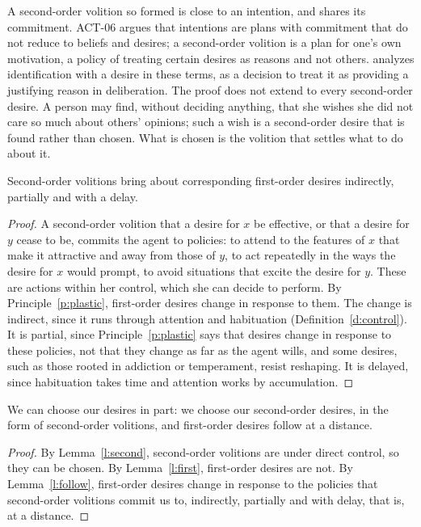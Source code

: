\documentclass{situationist-preprint}
\begin{document}
A second-order volition so formed is close to an intention, and shares its commitment. ACT-06 argues that intentions are plans with commitment that do not reduce to beliefs and desires; a second-order volition is a plan for one's own motivation, a policy of treating certain desires as reasons and not others. \citet{Bratman1996} analyzes identification with a desire in these terms, as a decision to treat it as providing a justifying reason in deliberation. The proof does not extend to every second-order desire. A person may find, without deciding anything, that she wishes she did not care so much about others' opinions; such a wish is a second-order desire that is found rather than chosen. What is chosen is the volition that settles what to do about it.

\begin{lemma}\label{l:follow}
Second-order volitions bring about corresponding first-order desires indirectly, partially and with a delay.
\end{lemma}

\begin{proof}
A second-order volition that a desire for $x$ be effective, or that a desire for $y$ cease to be, commits the agent to policies: to attend to the features of $x$ that make it attractive and away from those of $y$, to act repeatedly in the ways the desire for $x$ would prompt, to avoid situations that excite the desire for $y$. These are actions within her control, which she can decide to perform. By Principle~\ref{p:plastic}, first-order desires change in response to them. The change is indirect, since it runs through attention and habituation (Definition~\ref{d:control}). It is partial, since Principle~\ref{p:plastic} says that desires change in response to these policies, not that they change as far as the agent wills, and some desires, such as those rooted in addiction or temperament, resist reshaping. It is delayed, since habituation takes time and attention works by accumulation.
\end{proof}

\begin{theorem}\label{t:main}
We can choose our desires in part: we choose our second-order desires, in the form of second-order volitions, and first-order desires follow at a distance.
\end{theorem}

\begin{proof}
By Lemma~\ref{l:second}, second-order volitions are under direct control, so they can be chosen. By Lemma~\ref{l:first}, first-order desires are not. By Lemma~\ref{l:follow}, first-order desires change in response to the policies that second-order volitions commit us to, indirectly, partially and with delay, that is, at a distance.
\end{proof}
\end{document}
